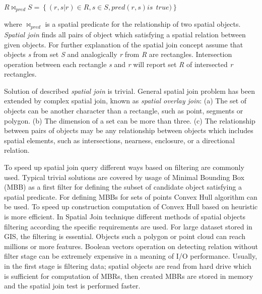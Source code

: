 \documentclass[a4paper,12pt,oneside]{report}
\begin{document}
	\begin{center}
		$R\bowtie_{pred}S=\left \{ \left ( r,s|r  \right )\in R,s \in S, pred(r,s) is \
		\ true) \right \}  $
	\end{center}
	where $\bowtie_{pred}$ is a spatial predicate for the relationship of two
	spatial objects. 
	\linebreak 
	\textit{Spatial join} finds all pairs of object which satisfying a spatial
	relation between given objects. 
	For further explanation of the spatial join concept assume that  objects
	\emph{s} from set \emph{S} and 
	analogically  \emph{r} from \emph{R} are rectangles. Intersection operation
	between each rectangle \emph{s} 
	and \emph{r} will report set \emph{R} of intersected \emph{r} rectangles.
	
	Solution of described \textit{spatial join} is trivial. General spatial join
	problem has been extended by 
	complex spatial join, known as \textit{spatial overlay join}\cite{spatial_join}:
	(a) The set of objects
	can be another character than a rectangle, such as point, segments or polygon.
	(b) The dimension of a set 
	can be more than three. (c) The relationship between pairs of objects may be any
	relationship between 
	objects which includes spatial elements, such as intersections, nearness,
	enclosure, or a directional relation. 
	
	To speed up spatial join query different ways based on filtering are commonly
	used.
	Typical trivial solutions are covered by usage of Minimal Bounding Box (MBB) as
	a first 
	filter for defining the subset of candidate object satisfying a spatial
	predicate. For defining MBBs for 
	sets of points Convex Hull algorithm can be used. 
	To speed up construction computation  of Convex Hull based on heuristic
	\cite{covex_hull} is more efficient. 
	In Spatial Join technique \cite{spatial_join}  different methods of  spatial
	objects filtering according the specific requirements are used. For large
	dataset stored in GIS, the filtering is essential. Objects such a polygon 
	or point cloud can reach millions or more features. Boolean vectors operation on
	detecting relation without filter stage 
	can be extremely expensive in a meaning of I/O performance. Usually, in the
	first stage is filtering data; spatial objects 
	are read from hard drive which is sufficient for computation of MBRs, then
	created MBRs are 
	stored in memory and the spatial join test is performed faster.
	
	
\end{document}
